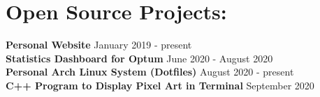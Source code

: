 \documentclass[10pt]{article}
\begin{document}
	\section*{Open Source Projects: \hrulefill}
		\textbf{Personal Website} \hfill January 2019 - present \\
		\textbf{Statistics Dashboard for Optum} \hfill June 2020 - August 2020 \\
		\textbf{Personal Arch Linux System (Dotfiles)} \hfill August 2020 - present \\
		\textbf{C++ Program to Display Pixel Art in Terminal} \hfill September 2020 \\
\end{document}
